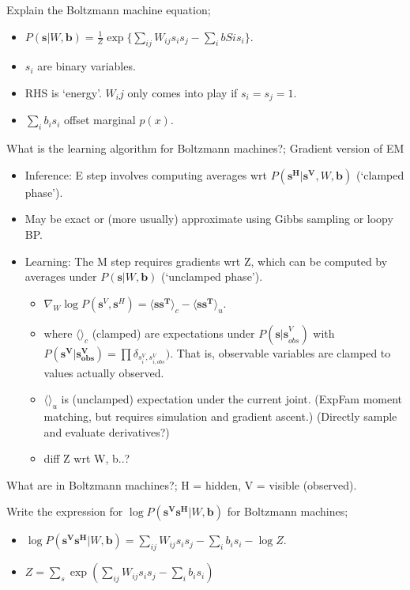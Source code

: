 \documentclass{article}
\begin{document}
Explain the Boltzmann machine equation; \begin{itemize} \item $P(\mathbf{s}|W, \mathbf{b})=\frac{1}{Z}\exp\{\sum_{ij}W_{ij}s_is_j-\sum_ibSis_i\}$. \item $s_i$ are binary variables. \item RHS is `energy'. $W_ij$ only comes into play if $s_i=s_j=1$. \item $\sum_i b_is_i$ offset marginal $p(x)$. \end{itemize}

What is the learning algorithm for Boltzmann machines?; Gradient version of EM \begin{itemize} \item Inference: E step involves computing averages wrt $P(\mathbf{s^H|s^V}, W, \mathbf{b})$ (`clamped phase'). \item May be exact or (more usually) approximate using Gibbs sampling or loopy BP. \item Learning: The M step requires gradients wrt Z, which can be computed by averages under $P(\mathbf{s}|W, \mathbf{b})$ (`unclamped phase'). \begin{itemize} \item $\nabla_W\log P(\mathbf{s}^V, \mathbf{s}^H)=\langle \mathbf{ss^T} \rangle_c - \langle \mathbf{ss^T} \rangle_u$. \item where $\langle \rangle_c$ (clamped) are expectations under $P(\mathbf{s|s}^V_{obs})$ with $P(\mathbf{s^V|s^V_{obs}})=\prod\delta_{s^V_i, s^V_{i, obs}})$. That is, observable variables are clamped to values actually observed. \item $\langle \rangle_u$ is (unclamped) expectation under the current joint. (ExpFam moment matching, but requires simulation and gradient ascent.) (Directly sample and evaluate derivatives?) \item diff Z wrt W, b..? \end{itemize} \end{itemize}

What are  in Boltzmann machines?; H = hidden, V = visible (observed).

Write the expression for $\log P(\mathbf{s^Vs^H}|W, \mathbf{b})$ for Boltzmann machines;  \begin{itemize} \item $\log P(\mathbf{s^Vs^H}|W, \mathbf{b})=\sum_{ij}W_{ij}s_is_j-\sum_ib_is_i - \log Z$. \item $Z=\sum_s \exp(\sum_{ij}W_{ij}s_is_j - \sum_i b_i s_i)$ \end{itemize}
\end{document}
